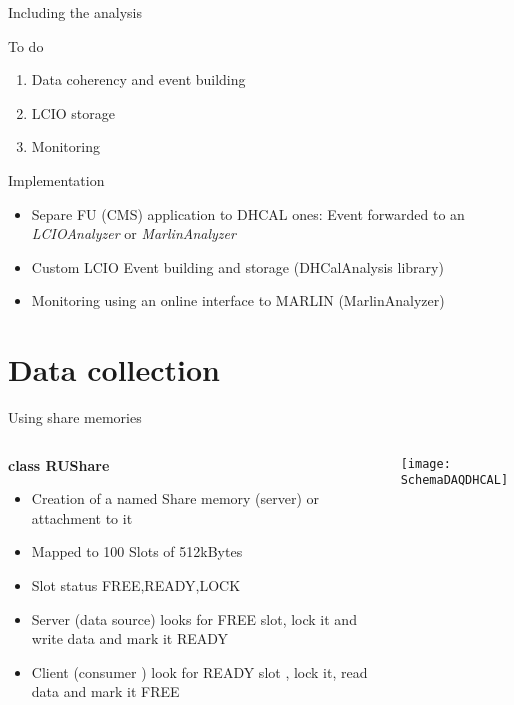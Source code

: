 \documentclass[10pt]{beamer}
\begin{document}
\begin{frame}{Including the analysis}

\begin{block}{ To do}
  \begin{enumerate}
    \item Data coherency and event building
    \item LCIO storage
    \item Monitoring
  \end{enumerate}
\end{block}
\pause 
\begin{block}{ Implementation}
  \begin{itemize}
    \item Separe FU (CMS) application to DHCAL ones: Event forwarded to an {\sl LCIOAnalyzer } or {\sl MarlinAnalyzer}
    \item Custom LCIO Event building and storage (DHCalAnalysis library)
    \item Monitoring using an online interface to MARLIN (MarlinAnalyzer)
  \end{itemize}
\end{block}

\end{frame}

\section{Data collection}

\begin{frame}{Using share memories}


\begin{columns}
 \begin{column}{0.5\textwidth}
 {\bf class RUShare } 
 \begin{itemize}
 \item <1-> Creation of a named Share memory (server) or attachment to it
 \item <1-> Mapped to 100 Slots of 512kBytes
 \item <1-> Slot status FREE,READY,LOCK
 \item <2->Server (data source) looks for FREE slot, lock it and write data and mark it READY
 \item <2->Client (consumer ) look for READY slot , lock it, read data and mark it FREE
 \end{itemize}
\end{column}
 \begin{column}{0.65\textwidth}
{
    \centerline{\texttt{[image: SchemaDAQDHCAL]}}
}
\end{column}
\end{columns}
\end{frame}
\end{document}
